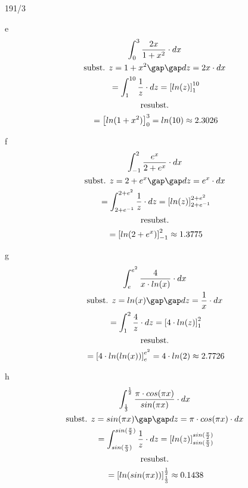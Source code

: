 \begin{exercise}{191/3}
  \item [e]
  \begin{gather*}
    \int_0^3 \frac{2x}{1 + x^2} \cdot dx \\
    \text{subst. } z = 1 + x^2 \gap\gap dz = 2x \cdot dx \\
    \;= \int_1^{10} \frac{1}{z} \cdot dz = \left[ln(z)\right]_1^{10} \\
    \text{resubst.} \\
    \;= \left[ln(1 + x^2)\right]_0^3 = ln(10) \approx 2.3026
  \end{gather*}
  \item [f]
  \begin{gather*}
    \int_{-1}^2 \frac{e^x}{2 + e^x} \cdot dx \\
    \text{subst. } z = 2 + e^x \gap\gap dz = e^x \cdot dx \\
    \;= \int_{2 + e^{-1}}^{2 + e^2} \frac{1}{z} \cdot dz = \left[ln(z)\right]_{2 + e^{-1}}^{2 + e^2} \\
    \text{resubst.} \\
    \;= \left[ln(2 + e^x)\right]_{-1}^2 \approx 1.3775
  \end{gather*}
  \item [g]
  \begin{gather*}
    \int_e^{e^2} \frac{4}{x \cdot ln(x)} \cdot dx \\
    \text{subst. } z = ln(x) \gap\gap dz = \frac{1}{x} \cdot dx \\
    \;= \int_1^2 \frac{4}{z} \cdot dz = \left[4 \cdot ln(z)\right]_1^2 \\
    \text{resubst.} \\
    \;= \left[4 \cdot ln(ln(x))\right]_e^{e^2} = 4 \cdot ln(2) \approx 2.7726
  \end{gather*}
  \item [h]
  \begin{gather*}
    \int_\frac{1}{3}^\frac{1}{2} \frac{\pi \cdot cos(\pi x)}{sin(\pi x)} \cdot dx \\
    \text{subst. } z = sin(\pi x) \gap\gap dz = \pi \cdot cos(\pi x) \cdot dx \\
    \;= \int_{sin(\frac{\pi}{3})}^{sin(\frac{\pi}{2})} \frac{1}{z} \cdot dz = \left[ln(z)\right]_{sin(\frac{\pi}{3})}^{sin(\frac{\pi}{2})} \\
    \text{resubst.} \\
    \;= \left[ln(sin(\pi x))\right]_\frac{1}{3}^\frac{1}{2} \approx 0.1438
  \end{gather*}
\end{exercise}
